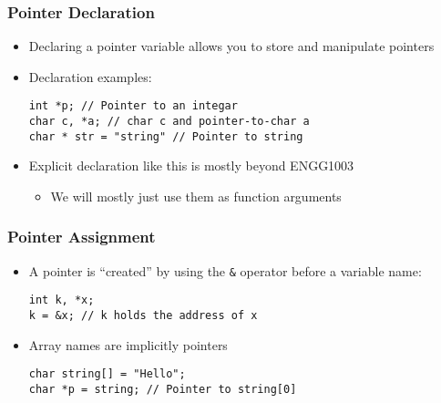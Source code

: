 \documentclass[14pt]{beamer}
\begin{document}
\begin{frame}[fragile]
\frametitle{Pointer Declaration}
\begin{itemize}
\item Declaring a pointer variable allows you to store and manipulate pointers
\item Declaration examples:
\begin{lstlisting}[style=CStyle]
int *p; // Pointer to an integar
char c, *a; // char c and pointer-to-char a
char * str = "string" // Pointer to string
\end{lstlisting}
\item Explicit declaration like this is mostly beyond ENGG1003
	\begin{itemize}
		\item We will mostly just use them as function arguments
	\end{itemize}
\end{itemize}
\end{frame}

\begin{frame}[fragile]
\frametitle{Pointer Assignment}
\begin{itemize}
\item A pointer is ``created'' by using the \texttt{\&} operator before a variable name:
\begin{lstlisting}[style=CStyle]
int k, *x;
k = &x; // k holds the address of x
\end{lstlisting}
\item Array names are implicitly pointers
\begin{lstlisting}[style=CStyle]
char string[] = "Hello";
char *p = string; // Pointer to string[0]
\end{lstlisting}
\end{itemize}
\end{frame}
\end{document}
